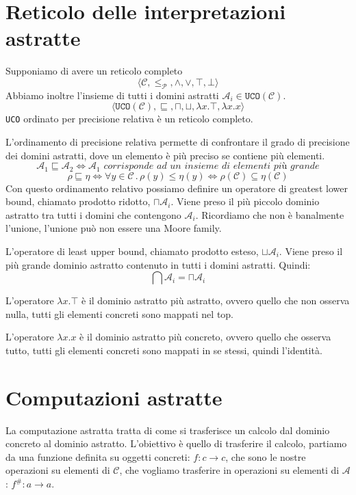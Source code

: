 \section{Reticolo delle interpretazioni astratte}
Supponiamo di avere un reticolo completo
\[
    \langle \mathcal{C}, \leq_\mathcal{P}, \land, \lor, \top, \bot \rangle
\]
Abbiamo inoltre l'insieme di tutti i domini astratti $\mathcal{A}_i \in \texttt{UCO}(\mathcal{C})$.
\[
    \langle \texttt{UCO}(\mathcal{C}), \sqsubseteq, \sqcap, \sqcup, \lambda x . \top,
    \lambda x . x \rangle
\] 
\texttt{UCO} ordinato per precisione relativa è un reticolo completo. 

L'ordinamento di precisione relativa permette di confrontare il grado di precisione dei domini 
astratti, dove un elemento è più preciso se contiene più elementi. 
\[
  \mathcal{A}_1 \sqsubseteq \mathcal{A}_2 \iff \mathcal{A}_1 \textit{ corrisponde ad un insieme 
  di elementi più grande} 
\]
\[
    \rho \sqsubseteq \eta \iff \forall y \in \mathcal{C} \, . \, \rho(y) \leq \eta(y)
    \iff \rho(\mathcal{C}) \subseteq \eta(\mathcal{C})
\]
Con questo ordinamento relativo possiamo definire un operatore di greatest lower bound, 
chiamato prodotto ridotto, $\sqcap \mathcal{A}_i$. Viene preso il più piccolo dominio astratto tra 
tutti i domini che contengono $\mathcal{A}_i$. Ricordiamo che non è banalmente l'unione, l'unione 
può non essere una {Moore family}.

L'operatore di least upper bound, chiamato prodotto esteso, $\sqcup \mathcal{A}_i$.
Viene preso il più grande dominio astratto contenuto in tutti i domini astratti.
Quindi:
\[
    \bigcap \mathcal{A}_i = \sqcap \mathcal{A}_i
\]

L'operatore $\lambda x . \top$ è il dominio astratto più astratto, ovvero quello che 
non osserva nulla, tutti gli elementi concreti sono mappati nel top.

L'operatore $\lambda x . x$ è il dominio astratto più concreto, ovvero quello che
osserva tutto, tutti gli elementi concreti sono mappati in se stessi, quindi l'identità.
\section{Computazioni astratte}
La computazione astratta tratta di come si trasferisce un calcolo dal dominio concreto al
dominio astratto.
L'obiettivo è quello di trasferire il calcolo, partiamo da una funzione definita su
oggetti concreti: $f : c \to c$, che sono le nostre operazioni su elementi di $\mathcal{C}$, 
che vogliamo trasferire in operazioni su elementi di $\mathcal{A}$: $f^\# : a \to a$.

